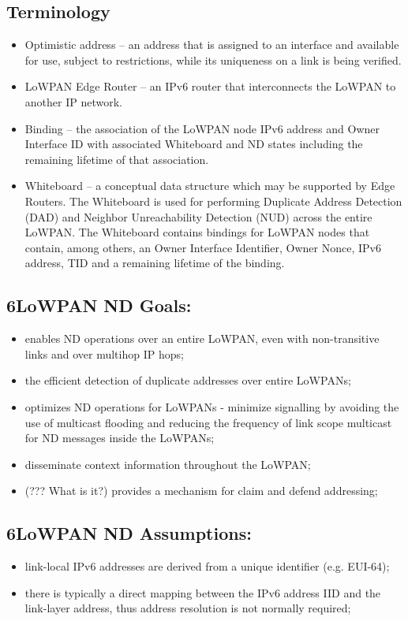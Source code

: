 \documentclass[a4paper,11pt,oneside]{article}
\begin{document}
\subsection{Terminology}
\begin{itemize}
\item Optimistic address -- an address that is assigned to an interface and available for use, subject to restrictions, while its uniqueness on a link is being verified. 
\item LoWPAN Edge Router -- an IPv6 router that interconnects the LoWPAN to another IP network.
\item Binding -- the association of the LoWPAN node IPv6 address and Owner Interface ID with associated Whiteboard and ND states including the remaining lifetime of that association.
\item Whiteboard -- a conceptual data structure which may be supported by Edge Routers.  The Whiteboard is used for      performing Duplicate Address Detection (DAD) and Neighbor Unreachability Detection (NUD) across the entire 	LoWPAN.  The Whiteboard contains bindings for LoWPAN nodes that contain, among others, an Owner Interface Identifier, Owner Nonce, IPv6 address, TID and a remaining lifetime of the binding.
\end{itemize}

\subsection{6LoWPAN ND Goals:}
\begin{itemize}
\item enables ND operations over an entire LoWPAN, even with non-transitive links and over multihop IP hops;
\item the efficient detection of duplicate addresses over entire LoWPANs;
\item optimizes ND operations for LoWPANs - minimize signalling by avoiding the use of multicast flooding and reducing the frequency of link scope multicast for ND messages inside the LoWPANs;
\item disseminate context information throughout the LoWPAN;
\item (??? What is it?) provides a mechanism for claim and defend addressing;
\end{itemize}

\subsection{6LoWPAN ND Assumptions:}
\begin{itemize}
\item link-local IPv6 addresses are derived from a unique identifier (e.g.  EUI-64);
\item there is typically a direct mapping between the IPv6 address IID and the link-layer address, thus address resolution is not normally required;

\end{itemize}
\end{document}
